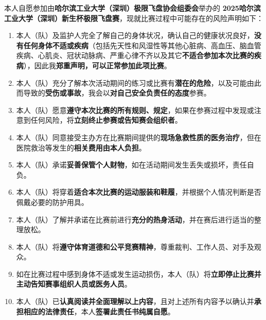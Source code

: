 \documentclass{article}
\begin{document}
本人自愿参加由\textbf{哈尔滨工业大学（深圳）极限飞盘协会组委会}举办的 \textbf{2025哈尔滨工业大学（深圳）新生杯极限飞盘赛}，现就比赛过程中可能存在的风险声明如下：

\begin{enumerate} %
\item 本人（队）及监护人完全了解自己的身体状况，确认自己的健康状况良好，\textbf{没有任何身体不适或疾病}（包括先天性和风湿性等其他心脏病、高血压、脑血管疾病、心肌炎、冠状动脉病、严重心律不齐以及其它\textbf{不适合参加本次比赛的疾病}），因此我\textbf{郑重声明，可以正常参加此项比赛}。
\item 本人（队）充分了解本次活动期间的练习或比赛有\textbf{潜在的危险}，以及可能由此而导致的\textbf{受伤或事故}，我会以\textbf{对自己安全负责任的态度}参赛。
\item 本人（队）愿意\textbf{遵守本次比赛的所有规则、规定}，如果在参赛过程中发现或注意到任何风险，将\textbf{立刻终止参赛或告知赛会组织者}。
\item 本人（队）同意接受主办方在比赛期间提供的\textbf{现场急救性质的医务治疗}，但在医院救治等发生的\textbf{相关费用由本人负担}。
\item 本人（队）承诺\textbf{妥善保管个人财物}，如在活动期间发生丢失或损坏，责任自负。
\item 本人（队）将穿着\textbf{适合本次比赛的运动服装和鞋履}，并根据个人情况判断是否佩戴必要的防护用具。
\item 本人（队）了解并承诺在比赛前进行\textbf{充分的热身活动}，并在赛后进行适当的整理放松。
\item 本人（队）将\textbf{遵守体育道德和公平竞赛精神}，尊重裁判、工作人员、对手及观众。
\item 如在比赛过程中感到身体不适或发生运动损伤，本人（队）将\textbf{立即停止比赛并主动告知赛事组织人员或医务人员}。
\item 本人（队）已\textbf{认真阅读并全面理解以上内容}，且对上述所有内容予以确认并\textbf{承担相应的法律责任}，本人\textbf{签署此责任书纯属自愿}。
\end{enumerate}

\vspace{0.5cm} %
\end{document}
